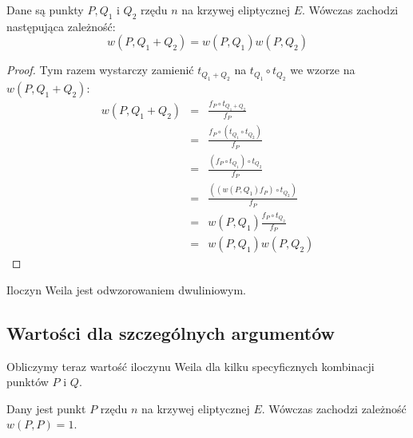 \begin{lemma}
Dane są punkty $P, Q_1$ i $Q_2$ rzędu $n$ na krzywej eliptycznej $E$.
Wówczas zachodzi następująca zależność:
\begin{equation}
w(P, Q_1 + Q_2) = w(P, Q_1)w(P, Q_2)
\end{equation}
\end{lemma}

\begin{proof}
Tym razem wystarczy zamienić $t_{Q_1 + Q_2}$ na $t_{Q_1} \circ t_{Q_2}$
we wzorze na $w(P, Q_1 + Q_2)$:
\begin{eqnarray*}
w(P, Q_1 + Q_2)
& = & \frac{f_P \circ t_{Q_1 + Q_2}}{f_P} \\
& = & \frac{f_P \circ (t_{Q_1} \circ t_{Q_2})}{f_P} \\
& = & \frac{(f_P \circ t_{Q_1}) \circ t_{Q_2}}{f_P} \\
& = & \frac{((w(P,Q_1)f_P) \circ t_{Q_2})}{f_P} \\
& = & w(P, Q_1)\frac{f_P \circ t_{Q_2}}{f_P} \\
& = & w(P, Q_1)w(P, Q_2)
\end{eqnarray*}
\end{proof}

\begin{corollary}
Iloczyn Weila jest odwzorowaniem dwuliniowym.
\end{corollary}

\subsection*{Wartości dla szczególnych argumentów}

\noindent
Obliczymy teraz wartość iloczynu Weila
dla kilku specyficznych kombinacji punktów $P$ i $Q$.

\begin{theorem}
Dany jest punkt $P$ rzędu $n$ na krzywej eliptycznej $E$.
Wówczas zachodzi zależność $w(P, P) = 1$.
\end{theorem}

